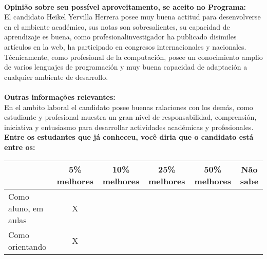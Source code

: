 \documentclass[11pt]{article}
\begin{document}
\\
\textbf{Opinião sobre seu possível aproveitamento, se aceito no Programa:}
\\El candidato Heikel Yervilla Herrera posee muy buena actitud para desenvolverse en el ambiente académico, sus notas son sobresalientes, su capacidad de aprendizaje es buena, como profesionalinvestigador ha publicado disimiles artículos en la web, ha participado en congresos internacionales y nacionales. Técnicamente, como profesional de la computación, posee un conocimiento amplio de varios lenguajes de programación y muy buena capacidad de adaptación a cualquier ambiente de desarrollo.\\ 
\\
\textbf{Outras informações relevantes:} \\En el ambito laboral el candidato posee buenas ralaciones con los demás, como estudiante y profesional muestra un gran nivel de responsabilidad, comprensión, iniciativa y entusiasmo para desarrollar actividades académicas y profesionales.
\\[0.3cm]
\textbf{Entre os estudantes que já conheceu, você diria que o candidato está entre os:}
\\
\begin{tabular}{|l|c|c|c|c|c|}
\hline
 & 5\% melhores & 10\% melhores & 25\% melhores & 50\% melhores & Não sabe \\
\hline
Como aluno, em aulas & X &  &  &  & \\
\hline
Como orientando & X &  &  &  & \\
\hline
\end{tabular}
\end{document}
